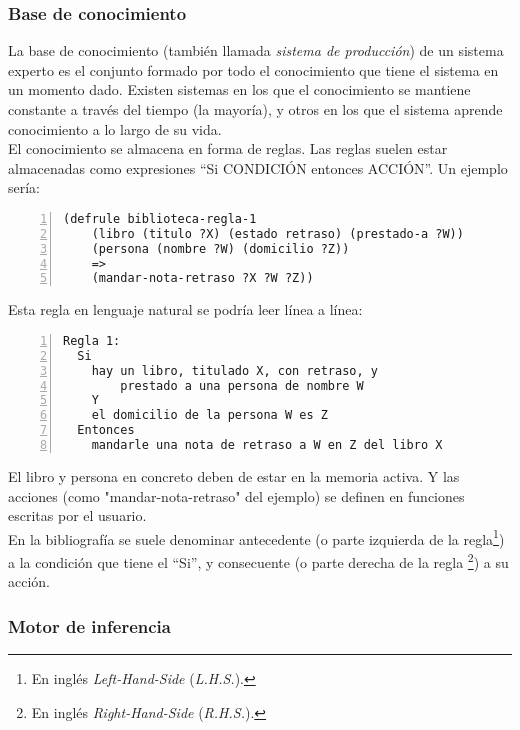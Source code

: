 \subsubsection{Base de conocimiento}

La base de conocimiento (también llamada \emph{sistema de producción}) de un
sistema experto es el conjunto formado por todo el conocimiento que
tiene el sistema en un momento dado. Existen sistemas en los que el
conocimiento se mantiene constante a través del tiempo (la mayoría), y
otros en los que el sistema aprende conocimiento a lo largo de su
vida. \\

El conocimiento se almacena en forma de reglas. Las reglas suelen
estar almacenadas como expresiones ``Si CONDICIÓN entonces
ACCIÓN''. Un ejemplo sería:

\begin{lstlisting}[caption={Regla en pseudocódigo}, numbers=left]
  (defrule biblioteca-regla-1
    (libro (titulo ?X) (estado retraso) (prestado-a ?W))
    (persona (nombre ?W) (domicilio ?Z))
    =>
    (mandar-nota-retraso ?X ?W ?Z))
\end{lstlisting}

Esta regla en lenguaje natural se podría leer línea a línea:
\begin{lstlisting}[caption={Regla en lenguaje natural}, numbers=left]
Regla 1:
  Si
    hay un libro, titulado X, con retraso, y 
        prestado a una persona de nombre W
    Y
    el domicilio de la persona W es Z
  Entonces
    mandarle una nota de retraso a W en Z del libro X
\end{lstlisting}

El libro y persona en concreto deben de estar en la memoria activa. Y
las acciones (como "mandar-nota-retraso" del ejemplo) se definen en
funciones escritas por el usuario. \\

En la bibliografía se suele denominar antecedente (o parte izquierda
de la regla\footnote{En inglés \emph{Left-Hand-Side}
  (\emph{L.H.S.}).}) a la condición que tiene el ``Si'', y
consecuente (o parte derecha de la regla \footnote{En inglés
  \emph{Right-Hand-Side} (\emph{R.H.S.}).}) a su acción. \\


\subsubsection{Motor de inferencia}

